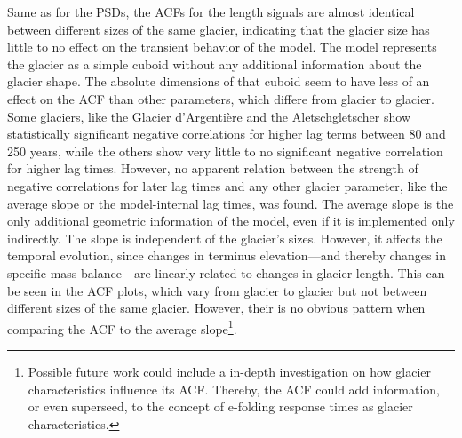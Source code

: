       Same as for the PSDs, the ACFs for the \vas{} length signals are almost identical between different sizes of the same glacier, indicating that the glacier size has little to no effect on the transient behavior of the model. The \vas{} model represents the glacier as a simple cuboid without any additional information about the glacier shape. The absolute dimensions of that cuboid seem to have less of an effect on the ACF than other parameters, which differe from glacier to glacier. Some glaciers, like the Glacier d'Argentière and the Aletschgletscher show statistically significant negative correlations for higher lag terms between 80 and 250 years, while the others show very little to no significant negative correlation for higher lag times. However, no apparent relation between the strength of negative correlations for later lag times and any other glacier parameter, like the average slope or the model-internal lag times, was found.
      The average slope is the only additional geometric information of the \vas{} model, even if it is implemented only indirectly. The slope is independent of the glacier's sizes. However, it affects the temporal evolution, since changes in terminus elevation---and thereby changes in specific mass balance---are linearly related to changes in glacier length. This can be seen in the ACF plots, which vary from glacier to glacier but not between different sizes of the same glacier.  However, their is no obvious pattern when comparing the ACF to the average slope\footnote{Possible future work could include a in-depth investigation on how glacier characteristics influence its ACF. Thereby, the ACF could add information, or even superseed, to the concept of e-folding response times as glacier characteristics.}.
    
